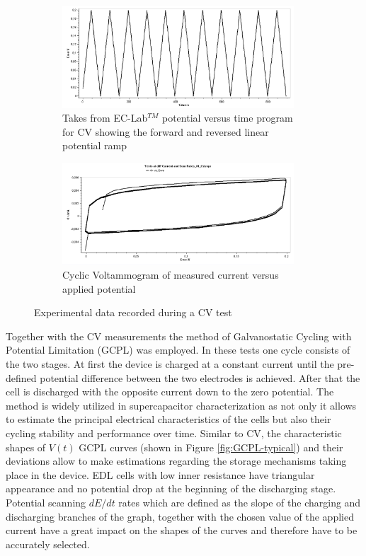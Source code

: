  
\begin{figure}[H]
\begin{subfigure}{1\textwidth}
\includegraphics[width=0.95\textwidth]{Figures/ExperimentalSetup/CV-Voltage-time.jpg}
\captionsetup{width=0.9\linewidth}
\caption{Takes from EC-Lab$^{TM}$ potential versus time program for CV showing the forward and reversed linear potential ramp}
\label{fig:CV-1}
\end{subfigure}
\begin{subfigure}{1\textwidth}
\includegraphics[width=0.95\textwidth]{Figures/ExperimentalSetup/CV-Voltage-I.jpg} 
\captionsetup{width=0.9\linewidth}
\caption{Cyclic Voltammogram of measured current versus applied potential}
\label{fig:CV-2}
\end{subfigure}
\medskip
\caption{Experimental data recorded during a CV test}
\label{fig:CV}
\end{figure}

 
 Together with the CV measurements the method of Galvanostatic Cycling with  Potential Limitation (GCPL) was employed. In these tests one cycle consists of the two stages. At first the device is charged at a constant current until the pre-defined potential difference between the two electrodes is achieved. After that the cell is discharged with the opposite current down to the zero potential. The method is widely utilized in supercapacitor characterization as not only it allows to estimate the principal electrical characteristics of the cells but also their cycling stability and performance over time. Similar to CV, the characteristic shapes of $V(t)$ GCPL curves (shown in Figure \ref{fig:GCPL-typical}) and their deviations allow to make estimations regarding the storage mechanisms taking place in the device. EDL cells with low inner resistance have triangular appearance and no potential drop at the beginning of the discharging stage. Potential scanning $dE/dt$ rates which are defined as the slope of the charging and discharging branches of the graph, together with the chosen value of the applied current have a great impact on the shapes of the curves and therefore have to be accurately selected.
 
